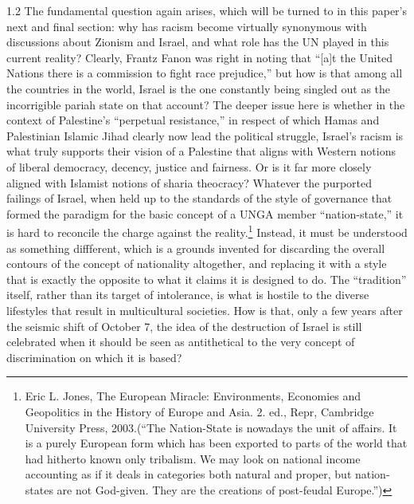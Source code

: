 \documentclass[../unravbook.tex]{subfiles}
\begin{document}
\begin{spacing}{1.2}
The fundamental question again arises, which will be turned to in this paper's next and final section: why has racism become virtually synonymous with discussions about Zionism and Israel, and what role has the UN played in this current reality? Clearly, Frantz Fanon was right in noting that \enquote{[a]t the United Nations there is a commission to fight race prejudice,} but how is that among all the countries in the world, Israel is the one constantly being singled out as the incorrigible pariah state on that account? The deeper issue here is whether in the context of Palestine's \enquote{perpetual resistance,} in respect of which Hamas and Palestinian Islamic Jihad clearly now lead the political struggle, Israel's racism is what truly supports their vision of a Palestine that aligns with Western notions of liberal democracy, decency, justice and fairness. Or is it far more closely aligned with Islamist notions of sharia theocracy? Whatever the purported failings of Israel, when held up to the standards of the style of governance that formed the paradigm for the basic concept of a UNGA member \enquote{nation-state,} it is hard to reconcile the charge against the reality.\footnote{Eric L. Jones, The European Miracle: Environments, Economies and Geopolitics in the History of Europe and Asia. 2. ed., Repr, Cambridge University Press, 2003.(\enquote{The Nation-State is nowadays the unit of affairs. It is a purely European form which has been exported to parts of the world that had hitherto known only tribalism. We may look on national income accounting as if it deals in categories both natural and proper, but nation-states are not God-given. They are the creations of post-feudal Europe.})} Instead, it must be understood as something diffferent, which is a grounds invented for discarding the overall contours of the concept of nationality altogether, and replacing it with a style that is exactly the opposite to what it claims it is designed to do. The \enquote{tradition} itself, rather than its target of intolerance, is what is hostile to the diverse lifestyles that result in multicultural societies. How is that, only a few years after the seismic shift of October 7, the idea of the destruction of Israel is still celebrated when it should be seen as antithetical to the very concept of discrimination on which it is based?


\end{spacing}
\end{document}

